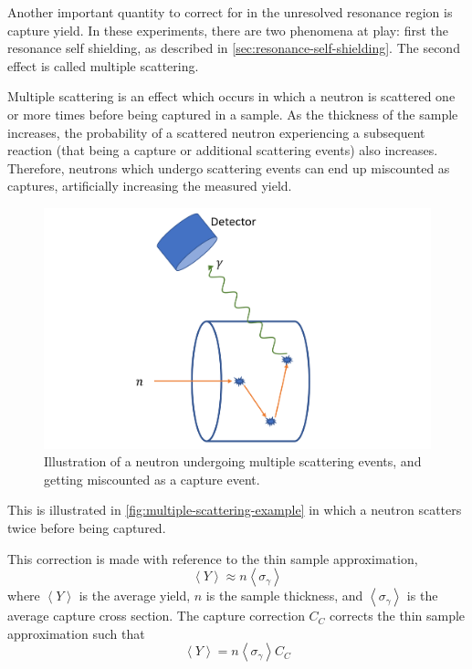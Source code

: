 Another important quantity to correct for in the unresolved resonance region is capture yield. In these experiments, there are two phenomena at play: first the resonance self shielding, as described in \autoref{sec:resonance-self-shielding}. The second effect is called multiple scattering.

Multiple scattering is an effect which occurs in which a neutron is scattered one or more times before being captured in a sample. As the thickness of the sample increases, the probability of a scattered neutron experiencing a subsequent reaction (that being a capture or additional scattering events) also increases. Therefore, neutrons which undergo scattering events can end up miscounted as captures, artificially increasing the measured yield.
\begin{figure}[H]
    \centering
    \includegraphics[width=0.75\linewidth]{Figures/multiplescattering.png}
    \caption{Illustration of a neutron undergoing multiple scattering events, and getting miscounted as a capture event.}
    \label{fig:multiple-scattering-example}
\end{figure}
This is illustrated in \autoref{fig:multiple-scattering-example} in which a neutron scatters twice before being captured.

This correction is made with reference to the thin sample approximation,
\begin{equation}
    \label{eq:thin-sample-approximation}
    \left\langle Y \right\rangle \approx n \left\langle \sigma_\gamma \right\rangle 
\end{equation}
where $\left\langle Y \right\rangle$ is the average yield, $n$ is the sample thickness, and $\left\langle \sigma_\gamma \right\rangle$ is the average capture cross section. The capture correction $C_C$ corrects the thin sample approximation such that
\begin{equation}
    \label{eq:correction-thin-sample-approximation}
    \left\langle Y \right\rangle = n \left\langle \sigma_\gamma \right\rangle C_C
\end{equation}

